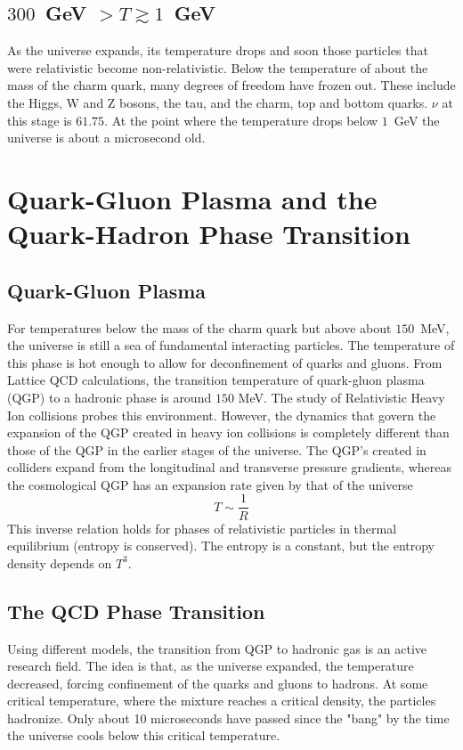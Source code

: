 \documentclass[12pt]{article}
\theoremstyle{plain}
\theoremstyle{definition}
\begin{document}
\subsection{$300$ \,GeV $>T\gtrsim1$ \,GeV}
\hspace{0.2in} As the universe expands, its temperature drops and soon those particles that were relativistic become non-relativistic. Below the temperature of about the mass of the charm quark, many degrees of freedom have frozen out. These include the Higgs, W and Z bosons, the tau, and the charm, top and bottom quarks. $\nu$ at this stage is $61.75$. At the point where the temperature drops below $1$ \,GeV the universe is about a microsecond old. 
\section{Quark-Gluon Plasma and the Quark-Hadron Phase Transition}
\subsection{Quark-Gluon Plasma}
\hspace{0.2in} For temperatures below the mass of the charm quark but above about $150$ \,MeV, the universe is still a sea of fundamental interacting particles. The temperature of this phase is hot enough to allow for deconfinement of quarks and gluons. From Lattice QCD calculations, the transition temperature of quark-gluon plasma (QGP) to a hadronic phase is around $150$ MeV. The study of Relativistic Heavy Ion collisions probes this environment. However, the dynamics that govern the expansion of the QGP created in heavy ion collisions is completely different than those of the QGP in the earlier stages of the universe. The QGP's created in colliders expand from the longitudinal and transverse pressure gradients, whereas the cosmological QGP has an expansion rate given by that of the universe
\begin{equation}
T\sim\frac{1}{R}
\end{equation}
This inverse relation holds for phases of relativistic particles in thermal equilibrium (entropy is conserved). The entropy is a constant, but the entropy density depends on $T^3$.
\subsection{The QCD Phase Transition}
\hspace{0.2in} Using different models, the transition from QGP to hadronic gas is an active research field. The idea is that, as the universe expanded, the temperature decreased, forcing confinement of the quarks and gluons to hadrons. At some critical temperature, where the mixture reaches a critical density, the particles hadronize. Only about 10 microseconds have passed since the "bang" by the time the universe cools below this critical temperature.
\end{document}
